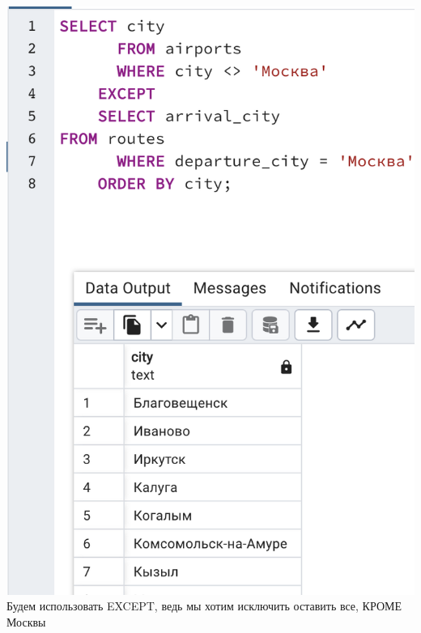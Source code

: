 \documentclass[a4paper,12pt]{article}
\begin{document}
\includegraphics[scale=0.6]{212.png}
\\
Будем использовать EXCEPT, ведь мы хотим исключить оставить все, КРОМЕ Москвы
\clearpage
\end{document}
